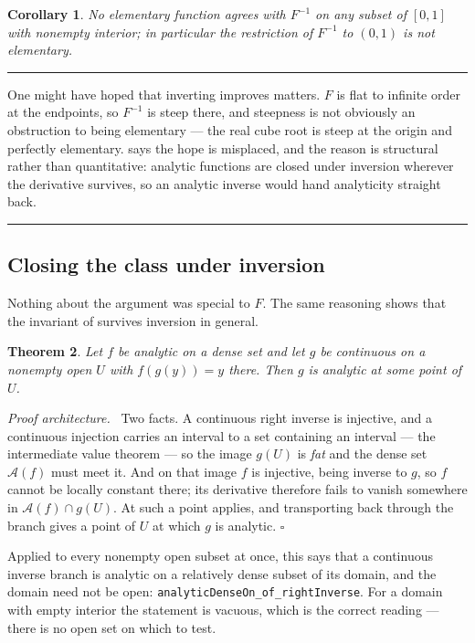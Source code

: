 \documentclass[11pt,oneside]{article}
\newtheorem{theorem}{Theorem}[section]
\newtheorem{corollary}[theorem]{Corollary}
\theoremstyle{definition}
\theoremstyle{remark}
\newcommand{\An}{\mathcal A}
\newenvironment{proofidea}{\par\smallskip\noindent\textit{Proof architecture.}\ }{\hfill$\square$\par\smallskip}
\newenvironment{boxedremark}{%
  \par\smallskip\noindent\begin{center}\begin{minipage}{0.94\textwidth}%
  \color{black}\hrule\vspace{0.6em}\small
}{%
  \vspace{0.6em}\hrule\end{minipage}\end{center}\smallskip
}
\begin{document}
\begin{corollary}\label{cor:invmain}
No elementary function agrees with $F^{-1}$ on any subset of $[0,1]$ with
nonempty interior; in particular the restriction of $F^{-1}$ to $(0,1)$ is not
elementary.
\end{corollary}

\begin{boxedremark}
One might have hoped that inverting improves matters.  $F$ is flat to infinite
order at the endpoints, so $F^{-1}$ is steep there, and steepness is not
obviously an obstruction to being elementary --- the real cube root is steep
at the origin and perfectly elementary.   says the hope
is misplaced, and the reason is structural rather than quantitative: analytic
functions are closed under inversion wherever the derivative survives, so an
analytic inverse would hand analyticity straight back.
\end{boxedremark}

\subsection{Closing the class under inversion}

Nothing about the argument was special to $F$.  The same reasoning shows that
the invariant of  survives inversion in general.

\begin{theorem}\label{thm:invbranch}
Let $f$ be analytic on a dense set and let $g$ be continuous on a nonempty
open $U$ with $f(g(y))=y$ there.  Then $g$ is analytic at some point of $U$.
\end{theorem}

\begin{proofidea}
Two facts.  A continuous right inverse is injective, and a continuous
injection carries an interval to a set containing an interval --- the
intermediate value theorem --- so the image $g(U)$ is \emph{fat} and the dense
set $\An(f)$ must meet it.  And on that image $f$ is injective, being inverse
to $g$, so $f$ cannot be locally constant there; its derivative therefore
fails to vanish somewhere in $\An(f)\cap g(U)$.  At such a point
 applies, and transporting back through the branch gives a point
of $U$ at which $g$ is analytic.
\end{proofidea}

Applied to every nonempty open subset at once, this says that a continuous
inverse branch is analytic on a relatively dense subset of its domain, and the
domain need not be open: \texttt{analyticDenseOn\_of\_rightInverse}.  For a
domain with empty interior the statement is vacuous, which is the correct
reading --- there is no open set on which to test.
\end{document}
